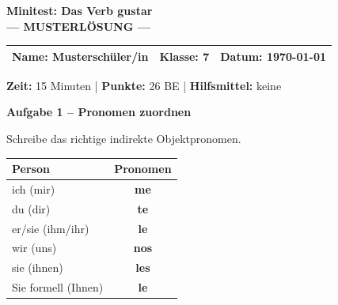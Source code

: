 \documentclass[11pt, a4paper]{article}
\newcommand{\fachfarbe}{spanisch}
\newcommand{\thema}{Minitest: Das Verb gustar}
\newcommand{\klasse}{7}
\newcommand{\maxpunkte}{26}
\newcommand{\zeit}{15 Minuten}
\newcommand{\datum}{\today}
\newcommand{\punktebox}[1]{\hfill\fbox{\small \_/#1}}
\newcommand{\lsg}[1]{\textcolor{loesung}{\textbf{#1}}}
\newenvironment{aufgabe}[1]{%
    \needspace{5\baselineskip}%
    \nopagebreak[4]%
    \vspace{10pt}
    \noindent\textbf{\textcolor{\fachfarbe}{Aufgabe #1}}
    \nopagebreak[4]%
    \vspace{5pt}
    \nopagebreak[4]%
    \begin{list}{}{\leftmargin=0pt}
    \item[]
}{%
    \end{list}
}
\begin{document}

\begin{center}
    {\Large\bfseries\textcolor{\fachfarbe}{\thema}}\\[0.3em]
    {\large\textcolor{loesung}{\textbf{--- MUSTERLÖSUNG ---}}}
\end{center}

\vspace{5pt}

\noindent
\begin{tabularx}{\textwidth}{|X|X|X|}
\hline
\textbf{Name:} \lsg{Musterschüler/in} &
\textbf{Klasse:} \klasse &
\textbf{Datum:} \datum \\
\hline
\end{tabularx}

\vspace{10pt}

\begin{infobox}
\textbf{Zeit:} \zeit{} | \textbf{Punkte:} \maxpunkte{} BE | \textbf{Hilfsmittel:} keine
\end{infobox}

\vspace{15pt}


\begin{aufgabe}{1 -- Pronomen zuordnen}
Schreibe das richtige indirekte Objektpronomen. \punktebox{6}
\end{aufgabe}

\begin{center}
\begin{tabular}{|l|c|}
\hline
\textbf{Person} & \textbf{Pronomen} \\
\hline
ich (mir) & \lsg{me} \\[0.8em]
\hline
du (dir) & \lsg{te} \\[0.8em]
\hline
er/sie (ihm/ihr) & \lsg{le} \\[0.8em]
\hline
wir (uns) & \lsg{nos} \\[0.8em]
\hline
sie (ihnen) & \lsg{les} \\[0.8em]
\hline
Sie formell (Ihnen) & \lsg{le} \\[0.8em]
\hline
\end{tabular}
\end{center}
\end{document}
